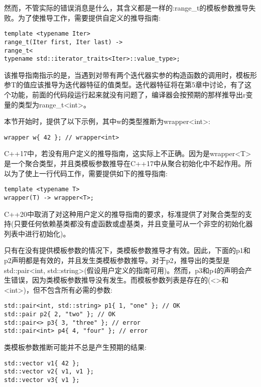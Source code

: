然而，不管实际的错误消息是什么，其含义都是一样的:range\_t的模板参数推导失败。为了使推导工作，需要提供自定义的推导指南:

\begin{lstlisting}[style=styleCXX]
template <typename Iter>
range_t(Iter first, Iter last) ->
range_t<
typename std::iterator_traits<Iter>::value_type>;
\end{lstlisting}

该推导指南指示的是，当遇到对带有两个迭代器实参的构造函数的调用时，模板形参T的值应该推导为迭代器特征的值类型。迭代器特征将在第5章中讨论，有了这个功能，前面的代码段运行起来就没有问题了，编译器会按预期的那样推导出r变量的类型为range\_t<int>。

本节开始时，提供了以下示例，其中w的类型推断为wrapper<int>:

\begin{lstlisting}[style=styleCXX]
wrapper w{ 42 }; // wrapper<int>
\end{lstlisting}

C++17中，若没有用户定义的推导指南，这实际上不正确。因为是wrapper<T>是一个聚合类型，并且类模板参数推导在C++17中从聚合初始化中不起作用。所以为了使上一行代码工作，需要提供如下的推导指南:

\begin{lstlisting}[style=styleCXX]
template <typename T>
wrapper(T) -> wrapper<T>;
\end{lstlisting}

C++20中取消了对这种用户定义的推导指南的要求，标准提供了对聚合类型的支持(只要任何依赖基类都没有虚函数或虚基类，并且变量可从一个非空的初始化器列表中进行初始化)。

只有在没有提供模板参数的情况下，类模板参数推导才有效。因此，下面的p1和p2声明都是有效的，并且发生类模板参数推导。对于p2，推导出的类型是std::pair<int, std::string>(假设用户定义的指南可用)。然而，p3和p4的声明会产生错误，因为类模板参数推导没有发生。而模板参数列表是存在的(<>和<int>)，但不包含所有必需的参数:

\begin{lstlisting}[style=styleCXX]
std::pair<int, std::string> p1{ 1, "one" }; // OK
std::pair p2{ 2, "two" }; // OK
std::pair<> p3{ 3, "three" }; // error
std::pair<int> p4{ 4, "four" }; // error
\end{lstlisting}

类模板参数推断可能并不总是产生预期的结果:

\begin{lstlisting}[style=styleCXX]
std::vector v1{ 42 };
std::vector v2{ v1, v1 };
std::vector v3{ v1 };
\end{lstlisting}

